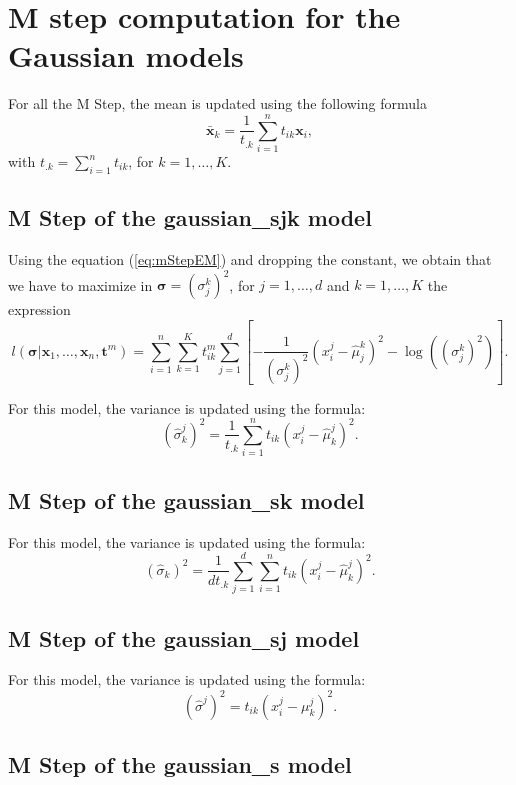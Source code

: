 \documentclass[a4paper,10pt]{article}
\newcommand{\bx}{\mathbf{x}}
\newcommand{\bt}{\mathbf{t}}
\newcommand{\bsigma}{\boldsymbol{\sigma}}
\begin{document}



\appendix

\section{M step computation for the Gaussian models}

For all the M Step, the mean is updated using the following formula
$$
\bar{\bx}_k = \frac{1}{t_{.k}} \sum_{i=1}^n t_{ik} \bx_i,
$$
with $t_{.k} = \sum_{i=1}^n t_{ik}$, for $k=1,\ldots,K$.


\subsection{M Step of the gaussian\_sjk model}

Using the equation (\ref{eq:mStepEM}) and dropping the constant, we obtain that we have to
maximize in $\bsigma = (\sigma_j^k)^2$, for $j=1,\ldots,d$ and $k=1,\ldots,K$ the expression
\begin{equation} \label{eq:gaussian_sjk}
l(\bsigma | {\bx}_{1},\ldots,{\bx}_{n}, {\bt}^m) = \sum_{i=1}^{n} \sum_{k=1}^{K} t_{ik}^m
     \sum_{j=1}^d \left[ - \frac{1}{(\sigma_j^k)^2} (x_i^j - \hat{\mu}_j^k)^2 - \log((\sigma_j^k)^2) \right].
\end{equation}

For this model, the variance is updated using the formula:
$$
(\hat{\sigma}^j_k)^2 = \frac{1}{t_{.k}} \sum_{i=1}^n t_{ik} (x^j_i-\hat{\mu}^j_k)^2.
$$

\subsection{M Step of the gaussian\_sk model}

For this model, the variance is updated using the formula:
$$
(\hat{\sigma}_k)^2 = \frac{1}{d t_{.k}} \sum_{j=1}^d\sum_{i=1}^n t_{ik} (x^j_i-\hat{\mu}^j_k)^2.
$$

\subsection{M Step of the gaussian\_sj model}

For this model, the variance is updated using the formula:
$$
(\hat{\sigma}^j)^2 =  t_{ik} (x^j_i-\mu^j_k)^2.
$$

\subsection{M Step of the gaussian\_s model}
\end{document}
